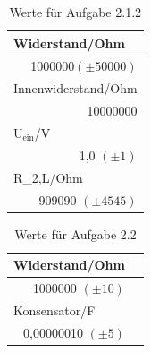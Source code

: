 \documentclass[12pt]{scrartcl}
\begin{document}
\begin{table}[htbp]
\caption{Werte für Aufgabe 2.1.2}
\begin{center}
\begin{tabular}{|l|}
\hline
Widerstand/Ohm \\ \hline
\multicolumn{1}{|r|}{1000000$(\pm 50000)$} \\ \hline
Innenwiderstand/Ohm  \\ \hline
\multicolumn{1}{|r|}{10000000} \\ \hline
U$_\text{ein}$/V  \\ \hline
\multicolumn{1}{|r|}{1,0 $(\pm 1)$}  \\ \hline
R\_2,L/Ohm \\ \hline
\multicolumn{1}{|r|}{909090 $(\pm 4545)$} \\ \hline
\end{tabular}
\end{center}
\label{tab:2.1.2}
\end{table}


\begin{table}[htbp]
\caption{Werte für Aufgabe 2.2}
\begin{center}
\begin{tabular}{|l|l|}
\hline
Widerstand/Ohm  \\ \hline
\multicolumn{1}{|r|}{1000000 $(\pm 10)$} \\ \hline
Konsensator/F \\ \hline
\multicolumn{1}{|r|}{0,00000010 $(\pm 5)$}\\ \hline
\end{tabular}
\end{center}
\label{tab:2.2}
\end{table}
\end{document}
